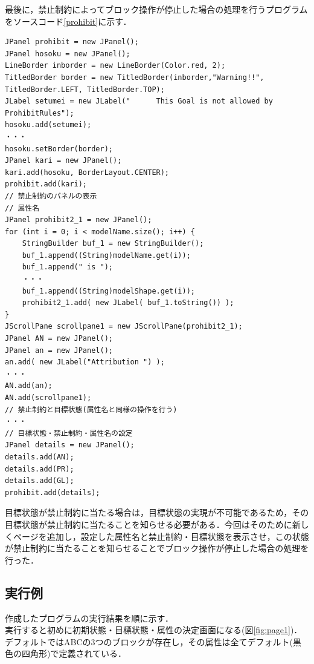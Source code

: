 \documentclass[12pt]{jarticle}
\begin{document}
最後に，禁止制約によってブロック操作が停止した場合の処理を行うプログラムをソースコード\ref{prohibit}に示す．
\begin{lstlisting}[caption=ブロックの状態を表すプログラム,label=prohibit]
JPanel prohibit = new JPanel();
JPanel hosoku = new JPanel();
LineBorder inborder = new LineBorder(Color.red, 2);
TitledBorder border = new TitledBorder(inborder,"Warning!!", TitledBorder.LEFT, TitledBorder.TOP);
JLabel setumei = new JLabel("      This Goal is not allowed by ProhibitRules");
hosoku.add(setumei);
・・・
hosoku.setBorder(border);
JPanel kari = new JPanel();
kari.add(hosoku, BorderLayout.CENTER);
prohibit.add(kari);
// 禁止制約のパネルの表示
// 属性名
JPanel prohibit2_1 = new JPanel();
for (int i = 0; i < modelName.size(); i++) {
	StringBuilder buf_1 = new StringBuilder();
	buf_1.append((String)modelName.get(i));
	buf_1.append(" is ");
	・・・
	buf_1.append((String)modelShape.get(i));
	prohibit2_1.add( new JLabel( buf_1.toString()) );
}
JScrollPane scrollpane1 = new JScrollPane(prohibit2_1);
JPanel AN = new JPanel();
JPanel an = new JPanel();
an.add( new JLabel("Attribution ") );
・・・
AN.add(an);
AN.add(scrollpane1);
// 禁止制約と目標状態(属性名と同様の操作を行う)
・・・
// 目標状態・禁止制約・属性名の設定
JPanel details = new JPanel();
details.add(AN);
details.add(PR);
details.add(GL);
prohibit.add(details);
\end{lstlisting}
目標状態が禁止制約に当たる場合は，目標状態の実現が不可能であるため，その目標状態が禁止制約に当たることを知らせる必要がある．今回はそのために新しくページを追加し，設定した属性名と禁止制約・目標状態を表示させ，この状態が禁止制約に当たることを知らせることでブロック操作が停止した場合の処理を行った．

\subsection{実行例}
作成したプログラムの実行結果を順に示す．\\
\clearpage
実行すると初めに初期状態・目標状態・属性の決定画面になる(図\ref{fig:page1})．デフォルトではABCの3つのブロックが存在し，その属性は全てデフォルト(黒色の四角形)で定義されている．\\
\end{document}
